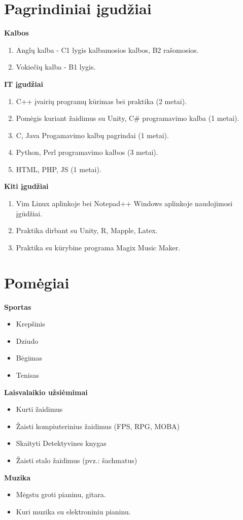\documentclass[a4paper,12pt]{article}
\begin{document}
\section{Pagrindiniai įgudžiai}
\textbf{Kalbos}
\begin{enumerate}
	\item Anglų kalba - C1 lygis kalbamosios kalbos, B2 rašomosios. 
	\item Vokiečių kalba - B1 lygis.
\end{enumerate}

\textbf{IT įgudžiai}
\begin{enumerate}
	\item C++ įvairių programų kūrimas bei praktika (2 metai).
	\item Pomėgis kuriant žaidimus su Unity, C\# programavimo kalba (1 metai).
	\item C, Java Progamavimo kalbų pagrindai (1 metai).
	\item Python, Perl programavimo kalbos (3 metai).
	\item HTML, PHP, JS (1 metai).
\end{enumerate}

\textbf{Kiti įgudžiai}
\begin{enumerate}
	\item Vim Linux aplinkoje bei Notepad++ Windows aplinkoje naudojimosi įgūdžiai.
	\item Praktika dirbant su Unity, R, Mapple, Latex.
	\item Praktika su kūrybine programa Magix Music Maker.
\end{enumerate}

\clearpage

\section{Pomėgiai}
\textbf{Sportas}
\begin{itemize}
	\item Krepšinis
	\item Dziudo
	\item Bėgimas
	\item Tenisas
\end{itemize}

\textbf{Laisvalaikio užsiėmimai}
\begin{itemize}
	\item Kurti žaidimus
	\item Žaisti kompiuterinius žaidimus (FPS, RPG, MOBA)
	\item Skaityti Detektyvines knygas
	\item Žaisti stalo žaidimus (pvz.: šachmatus)
\end{itemize}

\textbf{Muzika}
\begin{itemize}
	\item Mėgstu groti pianinu, gitara.
	\item Kuri muzika su elektroniniu pianinu.
\end{itemize}
\end{document}
